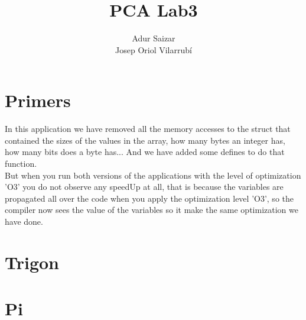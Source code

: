 \documentclass[10pt,a4paper]{article}
\author{Adur Saizar\\ Josep Oriol Vilarrubí}
\title{PCA Lab3}
\begin{document}
\maketitle
\tableofcontents
\pagebreak
\section{Primers}
In this application we have removed all the memory accesses to the struct that contained the sizes of the values in the array, how many bytes an integer has, how many bits does a byte has... And we have added some defines to do that function.\\

But when you run both versions of the applications with the level of optimization 'O3' you do not observe any speedUp at all, that is because the variables are propagated all over the code when you apply the optimization level 'O3', so the compiler now sees the value of the variables so it make the same optimization we have done.
\section{Trigon}

\section{Pi}
\end{document}
